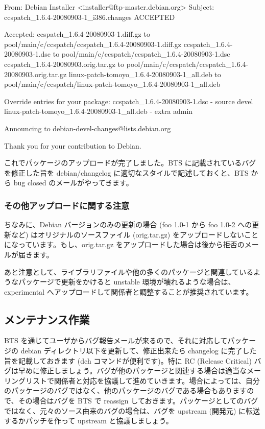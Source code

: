 \documentclass[mingoth,a4paper]{jsarticle}
\begin{document}
\begin{commandline}
From: Debian Installer <installer@ftp-master.debian.org>
Subject: ccspatch_1.6.4-20080903-1_i386.changes ACCEPTED

Accepted:
ccspatch_1.6.4-20080903-1.diff.gz
  to pool/main/c/ccspatch/ccspatch_1.6.4-20080903-1.diff.gz
ccspatch_1.6.4-20080903-1.dsc
  to pool/main/c/ccspatch/ccspatch_1.6.4-20080903-1.dsc
ccspatch_1.6.4-20080903.orig.tar.gz
  to pool/main/c/ccspatch/ccspatch_1.6.4-20080903.orig.tar.gz
linux-patch-tomoyo_1.6.4-20080903-1_all.deb
  to pool/main/c/ccspatch/linux-patch-tomoyo_1.6.4-20080903-1_all.deb


Override entries for your package:
ccspatch_1.6.4-20080903-1.dsc - source devel
linux-patch-tomoyo_1.6.4-20080903-1_all.deb - extra admin

Announcing to debian-devel-changes@lists.debian.org


Thank you for your contribution to Debian.
\end{commandline}

これでパッケージのアップロードが完了しました。BTS に記載されているバグを修正した旨を debian/changelog に適切なスタイルで記述しておくと、BTS から bug closed のメールがやってきます。


\subsubsection{その他アップロードに関する注意}

ちなみに、Debian バージョンのみの更新の場合 (foo 1.0-1 から foo 1.0-2 への更新など) はオリジナルのソースファイル (orig.tar.gz) をアップロードしないことになっています。もし、orig.tar.gz をアップロードした場合は後から拒否のメールが届きます。

あと注意として、ライブラリファイルや他の多くのパッケージと関連しているようなパッケージで更新をかけると unstable 環境が壊れるような場合は、experimental へアップロードして関係者と調整することが推奨されています。


\subsection{メンテナンス作業}

BTS を通じてユーザからバグ報告メールが来るので、それに対応してパッケージの debian ディレクトリ以下を更新して、修正出来たら changelog に完了した旨を記載しておきます (dch コマンドが便利です)。特に RC (Release Critical) バグは早めに修正しましょう。バグが他のパッケージと関連する場合は適当なメーリングリストで関係者と対応を協議して進めていきます。場合によっては、自分のパッケージのバグではなく、他のパッケージのバグである場合もありますので、その場合はバグを BTS で reassign しておきます。パッケージとしてのバグではなく、元々のソース由来のバグの場合は、バグを upstream (開発元) に転送するかパッチを作って upstream と協議しましょう。
\end{document}
